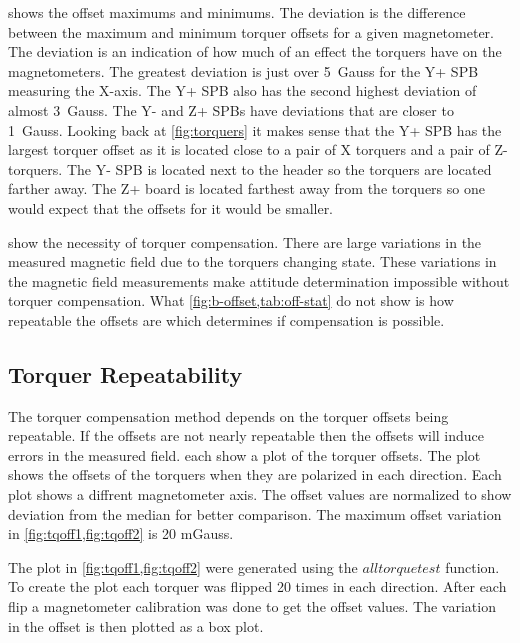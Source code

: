  shows the offset maximums and minimums. The deviation is the difference between the maximum and minimum torquer offsets for a given magnetometer. The deviation is an indication of how much of an effect the torquers have on the magnetometers. The greatest deviation is just over 5~Gauss for the Y+ \ac{SPB} measuring the X-axis. The Y+ \ac{SPB} also has the second highest deviation of almost 3~Gauss. The Y- and Z+ \acp{SPB} have deviations that are closer to 1~Gauss. Looking back at \cref{fig:torquers} it makes sense that the Y+ \ac{SPB} has the largest torquer offset as it is located close to a pair of X torquers and a pair of Z-torquers. The Y- \ac{SPB} is located next to the header so the torquers are located farther away. The Z+ board is located farthest away from the torquers so one would expect that the offsets for it would be smaller.


 show the necessity of torquer compensation. There are large variations in the measured magnetic field due to the torquers changing state. These variations in the magnetic field measurements make attitude determination impossible without torquer compensation. What \cref{fig:b-offset,tab:off-stat} do not show is how repeatable the offsets are which determines if compensation is possible. 

\subsection{Torquer Repeatability}


The torquer compensation method depends on the torquer offsets being repeatable. If the offsets are not nearly repeatable then the offsets will induce errors in the measured field.  each show a plot of the torquer offsets. The plot shows the offsets of the torquers when they are polarized in each direction. Each plot shows a diffrent magnetometer axis. The offset values are normalized to show deviation from the median for better comparison. The maximum offset variation in \cref{fig:tqoff1,fig:tqoff2} is 20 mGauss.

The plot in \cref{fig:tqoff1,fig:tqoff2} were generated using the \lstMat$alltorquetest$ function. To create the plot each torquer was flipped 20 times in each direction. After each flip a magnetometer calibration was done to get the offset values. The variation in the offset is then plotted as a box plot.

